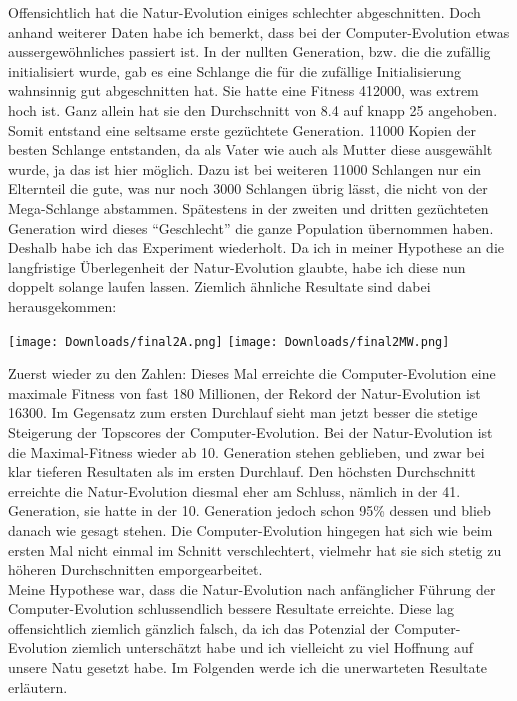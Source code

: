 \documentclass[10pt,a4paper,ngerman,english]{article}
\begin{document}
Offensichtlich hat die Natur-Evolution einiges schlechter abgeschnitten. Doch anhand weiterer Daten habe ich bemerkt, dass bei der Computer-Evolution etwas aussergewöhnliches passiert ist. In der nullten Generation, bzw. die die zufällig initialisiert wurde, gab es eine Schlange die für die zufällige Initialisierung wahnsinnig gut abgeschnitten hat. Sie hatte eine Fitness 412000, was extrem hoch ist. Ganz allein hat sie den Durchschnitt von 8.4 auf knapp 25 angehoben. Somit entstand eine seltsame erste gezüchtete Generation. 11000 Kopien der besten Schlange entstanden, da als Vater wie auch als Mutter diese ausgewählt wurde, ja das ist hier möglich. Dazu ist bei weiteren 11000 Schlangen nur ein Elternteil die gute, was nur noch 3000 Schlangen übrig lässt, die nicht von der Mega-Schlange abstammen. Spätestens in der zweiten und dritten gezüchteten Generation wird dieses \enquote{Geschlecht} die ganze Population übernommen haben. Deshalb habe ich das Experiment wiederholt. Da ich in meiner Hypothese an die langfristige Überlegenheit der Natur-Evolution glaubte, habe ich diese nun doppelt solange laufen lassen. Ziemlich ähnliche Resultate sind dabei herausgekommen:

\begin{center}
    \texttt{[image: Downloads/final2A.png]}
    \texttt{[image: Downloads/final2MW.png]}
\end{center}

Zuerst wieder zu den Zahlen: Dieses Mal erreichte die Computer-Evolution eine maximale Fitness von fast 180 Millionen, der Rekord der Natur-Evolution ist 16300. Im Gegensatz zum ersten Durchlauf sieht man jetzt besser die stetige Steigerung der Topscores der Computer-Evolution. Bei der Natur-Evolution ist die Maximal-Fitness wieder ab 10. Generation stehen geblieben, und zwar bei klar tieferen Resultaten als im ersten Durchlauf. Den höchsten Durchschnitt erreichte die Natur-Evolution diesmal eher am Schluss, nämlich in der 41. Generation, sie hatte in der 10. Generation jedoch schon 95\% dessen und blieb danach wie gesagt stehen. Die Computer-Evolution hingegen hat sich wie beim ersten Mal nicht einmal im Schnitt verschlechtert, vielmehr hat sie sich stetig zu höheren Durchschnitten emporgearbeitet.\\

Meine Hypothese war, dass die Natur-Evolution nach anfänglicher Führung der Computer-Evolution schlussendlich bessere Resultate erreichte. Diese lag offensichtlich ziemlich gänzlich falsch, da ich das Potenzial der Computer-Evolution ziemlich unterschätzt habe und ich vielleicht zu viel Hoffnung auf unsere Natu gesetzt habe. Im Folgenden werde ich die unerwarteten Resultate erläutern.\\
\end{document}
